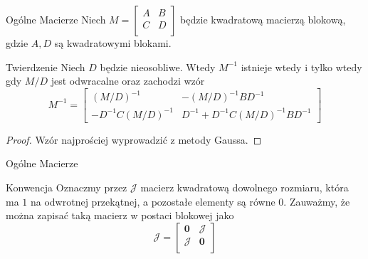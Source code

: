 \documentclass{beamer}
\newcommand{\zero}{\mathbf{0}}
\begin{document}
\begin{frame}{Ogólne Macierze}
    Niech $M = \begin{bmatrix}
        A & B \\ C & D \\ 
    \end{bmatrix}$ będzie kwadratową macierzą blokową, gdzie $A,D$ są kwadratowymi blokami.
    \begin{block}{Twierdzenie}
        Niech $D$ będzie nieosobliwe. Wtedy $M^{-1}$ istnieje wtedy i tylko wtedy gdy $M/D$ jest odwracalne 
        oraz zachodzi wzór
        $$ M^{-1}  = \begin{bmatrix}
            (M/D)^{-1} & -(M/D)^{-1} B D^{-1} \\
            -D^{-1} C (M/D)^{-1}  & D^{-1} + D^{-1} C (M/D)^{-1} B D^{-1}
        \end{bmatrix}$$
    \end{block}
    \begin{proof}
        Wzór najprościej wyprowadzić z metody Gaussa. 
    \end{proof}
\end{frame}

\begin{frame}{Ogólne Macierze}
    \begin{alertblock}{Konwencja}
        Oznaczmy przez $\mathcal{J}$ macierz kwadratową dowolnego rozmiaru, która ma $1$ na odwrotnej przekątnej, a pozostałe 
        elementy są równe $0$. Zauważmy, że można zapisać taką macierz w postaci blokowej jako
        $$ \mathcal{J} = \begin{bmatrix}
            \zero & \mathcal{J} \\ 
            \mathcal{J} & \zero \\ 
        \end{bmatrix}$$
    \end{alertblock}
\end{frame}
\end{document}

